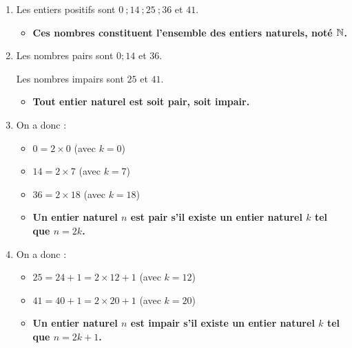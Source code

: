 \documentclass[10pt, a4paper]{article}
\begin{document}
\begin{Solution}[ACTIVITÉ][1]
\begin{enumerate}[leftmargin=*,itemsep=0.5pt]
    \item Les entiers positifs sont $0 ~; 14 ~; 25 ~; 36$ et $41$. 
    \begin{itemize}[label=$\blacktriangleright$, leftmargin=*, nosep]
    \item \textbf{Ces nombres constituent l'ensemble des \textcolor{PrimaryColor}{entiers naturels}, noté $\mathbb{N}$.}
    \end{itemize}

    \item Les nombres pairs sont $0 ; 14$ et $36$.
    
    Les nombres impairs sont $25$ et $41$.

    \begin{itemize}[label=$\blacktriangleright$, leftmargin=*, nosep]
    \item \textbf{Tout entier naturel est soit \textcolor{PrimaryColor}{pair}, soit \textcolor{PrimaryColor}{impair}.}
    \end{itemize}

    \item On a donc :
    \begin{itemize}[leftmargin=*,itemsep=0.5pt]
        \item $0 = 2 \times 0$ (avec $k=0$)

        \item $14 = 2 \times 7$ (avec $k=7$)

        \item $36 = 2 \times 18$ (avec $k=18$)
    \end{itemize}

    
    \begin{itemize}[label=$\blacktriangleright$, leftmargin=*, nosep]
    \item \textbf{Un entier naturel $n$ est \textcolor{PrimaryColor}{pair} s'il existe un entier naturel $k$ tel que $n = 2k$.}
    \end{itemize}
    
    \item On a donc :
    \begin{itemize}[leftmargin=*,itemsep=0.5pt]
        \item $25 = 24 + 1 = 2 \times 12 + 1$ (avec $k=12$)
        \item $41 = 40 + 1 = 2 \times 20 + 1$ (avec $k=20$)
    \end{itemize}

    \begin{itemize}[label=$\blacktriangleright$, leftmargin=*, nosep]
    \item \textbf{Un entier naturel $n$ est \textcolor{PrimaryColor}{impair} s'il existe un entier naturel $k$ tel que $n = 2k+1$.}
\end{itemize}
\end{enumerate}
\end{Solution}
\end{document}
